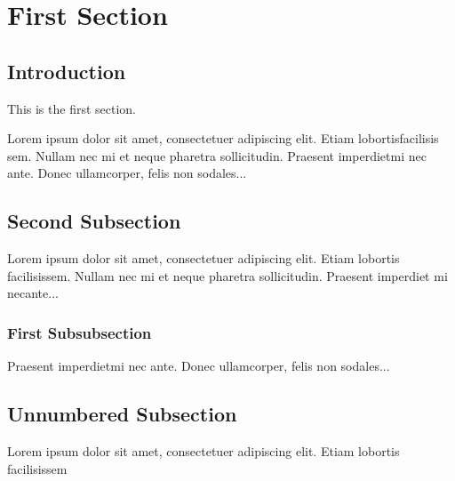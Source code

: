 \documentclass[12pt]{article}
\begin{document}
\section{First Section}

\subsection{Introduction}

This is the first section.

Lorem  ipsum  dolor  sit  amet,  consectetuer  adipiscing  
elit.   Etiam  lobortisfacilisis sem.  Nullam nec mi et 
neque pharetra sollicitudin.  Praesent imperdietmi nec ante. 
Donec ullamcorper, felis non sodales...

\subsection{Second Subsection}

Lorem ipsum dolor sit amet, consectetuer adipiscing elit.  
Etiam lobortis facilisissem.  Nullam nec mi et neque pharetra 
sollicitudin.  Praesent imperdiet mi necante...

\subsubsection{First Subsubsection}
Praesent imperdietmi nec ante. Donec ullamcorper, felis non sodales...

\subsection*{Unnumbered Subsection}
Lorem ipsum dolor sit amet, consectetuer adipiscing elit.  
Etiam lobortis facilisissem
\end{document}
